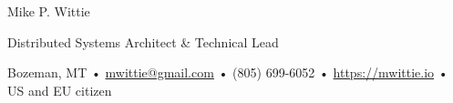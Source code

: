 \begin{center}
    {\huge Mike P. Wittie}\\
    \vspace*{0.25cm}

    {\Large Distributed Systems Architect \& Technical Lead}

    \vspace*{0.10cm}

	Bozeman, MT • \href{mailto:mwittie@gmail.com}{mwittie@gmail.com} • (805)
	699-6052 • \href{https://mwittie.io}{https://mwittie.io} • US and EU citizen

\end{center}
\vspace*{0.4cm}

